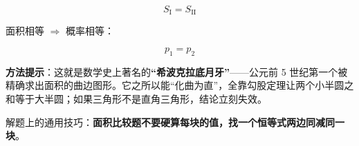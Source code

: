 \begin{answer}
\nopagebreak[4]
\[S_{\text{I}}=S_{\text{II}}\]

面积相等 $\Rightarrow$ 概率相等：

\nopagebreak[4]
\[p_1=p_2\]

\begin{gktip}
\textbf{方法提示}：这就是数学史上著名的\textbf{“希波克拉底月牙”}——公元前 5 世纪第一个被精确求出面积的曲边图形。它之所以能“化曲为直”，全靠勾股定理让两个小半圆之和等于大半圆；如果三角形不是直角三角形，结论立刻失效。

解题上的通用技巧：\textbf{面积比较题不要硬算每块的值，找一个恒等式两边同减同一块}。
\end{gktip}


\par\medskip

\end{answer}
